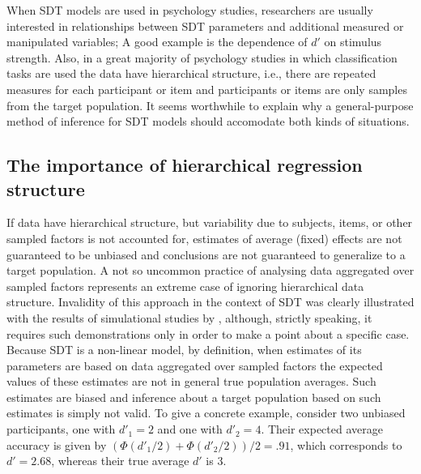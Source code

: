 \documentclass[oneside,a4paper]{article}
\begin{document}
When SDT models are used in psychology studies, researchers are
usually interested in relationships between SDT parameters and
additional measured or manipulated
variables; A good example is the dependence of $d'$ on stimulus
strength. Also, in a great majority of psychology studies in which
classification tasks are used the data have hierarchical structure,
i.e., there are repeated measures for each participant or item and
participants or items are only samples from the target population. It
seems worthwhile to explain why a general-purpose method of inference
for SDT models should accomodate both kinds of situations.

\subsection{The importance of hierarchical regression structure}

If data have hierarchical structure, but variability due to subjects,
items, or other sampled factors is not accounted for, estimates of
average (fixed) effects are not guaranteed to be unbiased and
conclusions are not guaranteed to generalize to a target population. A
not so uncommon practice of analysing data aggregated over sampled
factors represents an extreme case of ignoring
hierarchical data structure. Invalidity of this approach in the
context of SDT was clearly illustrated with the results of
simulational studies by , although,
strictly speaking, it requires such demonstrations only in order to
make a point about a specific case. Because SDT is a non-linear model,
by definition, when estimates of its parameters are based on data
aggregated over sampled factors the expected values of these estimates
are not in general true population averages. Such estimates are
biased and inference about a target population based on such estimates
is simply not valid. To give a concrete example, consider two unbiased
participants, one with $d'_1 = 2$ and one with $d'_2 = 4$. Their
expected average accuracy is given by
$(\Phi(d'_1/2) + \Phi(d'_2/2)) / 2 = .91$, which corresponds to
$d' = 2.68$, whereas their true average $d'$ is $3$.
\end{document}

